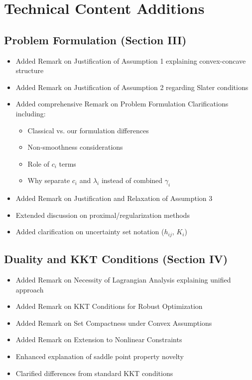 \documentclass[11pt]{article}
\begin{document}
\section{Technical Content Additions}

\subsection{Problem Formulation (Section III)}
\begin{itemize}
\item Added Remark on Justification of Assumption 1 explaining convex-concave structure
\item Added Remark on Justification of Assumption 2 regarding Slater conditions
\item Added comprehensive Remark on Problem Formulation Clarifications including:
  \begin{itemize}
  \item Classical vs. our formulation differences
  \item Non-smoothness considerations
  \item Role of $c_i$ terms
  \item Why separate $c_i$ and $\lambda_i$ instead of combined $\gamma_i$
  \end{itemize}
\item Added Remark on Justification and Relaxation of Assumption 3
\item Extended discussion on proximal/regularization methods
\item Added clarification on uncertainty set notation ($h_{ij}$, $K_i$)
\end{itemize}

\subsection{Duality and KKT Conditions (Section IV)}
\begin{itemize}
\item Added Remark on Necessity of Lagrangian Analysis explaining unified approach
\item Added Remark on KKT Conditions for Robust Optimization
\item Added Remark on Set Compactness under Convex Assumptions
\item Added Remark on Extension to Nonlinear Constraints
\item Enhanced explanation of saddle point property novelty
\item Clarified differences from standard KKT conditions
\end{itemize}
\end{document}

